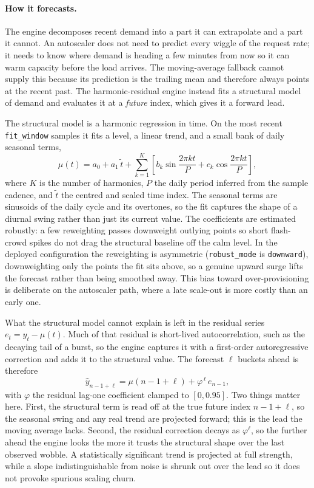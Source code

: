 \paragraph{How it forecasts.} The engine decomposes recent demand into a part it
can extrapolate and a part it cannot. An autoscaler does not need to predict every
wiggle of the request rate; it needs to know where demand is heading a few minutes
from now so it can warm capacity before the load arrives. The moving-average
fallback cannot supply this because its prediction is the trailing mean and
therefore always points at the recent past. The harmonic-residual engine instead
fits a structural model of demand and evaluates it at a \emph{future} index, which
gives it a forward lead.

The structural model is a harmonic regression in time. On the most recent
\texttt{fit\_window} samples it fits a level, a linear trend, and a small bank of
daily seasonal terms,
%
\begin{equation}\label{imb:eq:harmonic}
  \mu(t) = a_0 + a_1\,\tilde{t}
  + \sum_{k=1}^{K}\!\left[ b_k \sin\!\frac{2\pi k t}{P}
  + c_k \cos\!\frac{2\pi k t}{P} \right],
\end{equation}
%
where $K$ is the number of harmonics, $P$ the daily period inferred from the
sample cadence, and $\tilde{t}$ the centred and scaled time index. The seasonal
terms are sinusoids of the daily cycle and its overtones, so the fit captures the
shape of a diurnal swing rather than just its current value. The coefficients are
estimated robustly: a few reweighting passes downweight outlying points so short
flash-crowd spikes do not drag the structural baseline off the calm level. In the
deployed configuration the reweighting is asymmetric (\texttt{robust\_mode} is
\texttt{downward}), downweighting only the points the fit sits above, so a genuine
upward surge lifts the forecast rather than being smoothed away. This bias toward
over-provisioning is deliberate on the autoscaler path, where a late scale-out is
more costly than an early one.

What the structural model cannot explain is left in the residual series
$e_t = y_t - \mu(t)$. Much of that residual is short-lived autocorrelation, such as
the decaying tail of a burst, so the engine captures it with a first-order
autoregressive correction and adds it to the structural value. The forecast
$\ell$ buckets ahead is therefore
%
\begin{equation}\label{imb:eq:point}
  \hat{y}_{n-1+\ell} = \mu(n-1+\ell) + \varphi^{\,\ell}\, e_{n-1},
\end{equation}
%
with $\varphi$ the residual lag-one coefficient clamped to $[0,0.95]$. Two things
matter here. First, the structural term is read off at the true future index
$n-1+\ell$, so the seasonal swing and any real trend are projected forward; this
is the lead the moving average lacks. Second, the residual correction decays as
$\varphi^{\ell}$, so the further ahead the engine looks the more it trusts the
structural shape over the last observed wobble. A statistically significant trend
is projected at full strength, while a slope indistinguishable from noise is shrunk
out over the lead so it does not provoke spurious scaling churn.

